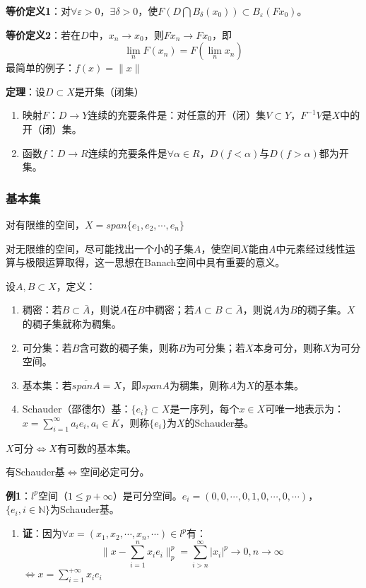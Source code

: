 \documentclass[12pt,a4paper]{article}
\begin{document}
\textbf{等价定义1}：对$\forall \varepsilon>0$，$\exists\delta>0$，使$F(D\bigcap B_{\delta}(x_0))\subset B_{\varepsilon}(Fx_0)$。

\textbf{等价定义2}：若在$D$中，$x_n\rightarrow x_0$，则$Fx_n\rightarrow Fx_0$，即
\begin{equation}
	\lim_nF(x_n)=F(\lim_nx_n)
\end{equation}
最简单的例子：$f(x)=\|x\|$

\textbf{定理}：设$D\subset X$是开集（闭集）
\begin{enumerate}
	\item 映射$F$：$D\rightarrow Y$连续的充要条件是：对任意的开（闭）集$V\subset Y$，$F^{-1}V$是$X$中的开（闭）集。
	\item 函数$f$：$D\rightarrow R$连续的充要条件是$\forall \alpha\in R$，$D(f<\alpha)$与$D(f>\alpha)$都为开集。
\end{enumerate}

\subsubsection{基本集}
对有限维的空间，$X=span\{e_1,e_2,\cdots,e_n\}$

对无限维的空间，尽可能找出一个小的子集$A$，使空间$X$能由$A$中元素经过线性运算与极限运算取得，这一思想在Banach空间中具有重要的意义。

设$A,B\subset X$，定义：
\begin{enumerate}
	\item 稠密：若$B\subset \bar{A}$，则说$A$在$B$中稠密；若$A\subset B\subset \bar{A}$，则说$A$为$B$的稠子集。$X$的稠子集就称为稠集。
	\item 可分集：若$B$含可数的稠子集，则称$B$为可分集；若$X$本身可分，则称$X$为可分空间。
	\item 基本集：若$\overline{spanA}=X$，即$spanA$为稠集，则称$A$为$X$的基本集。
	\item Schauder（邵德尔）基：$\{e_i\}\subset X$是一序列，每个$x\in X$可唯一地表示为：$x=\sum_{i=1}^{\infty}a_ie_i,a_i\in K$，则称$\{e_i\}$为$X$的Schauder基。
\end{enumerate}

$X$可分$\Leftrightarrow X$有可数的基本集。

有Schauder基$\Leftrightarrow$空间必定可分。

\textbf{例1}：$l^p$空间（$1\leqslant p +\infty$）是可分空间。$e_i=(0,0,\cdots,0,1,0,\cdots,0,\cdots)$，$\{e_i,i\in \mathbb{N}\}$为Schauder基。
\begin{enumerate}
	\item []
	\textbf{证}：因为$\forall x=(x_1,x_2,\cdots,x_n,\cdots)\in l^p$有：
\begin{equation}
	\|x-\sum_{i=1}^{n}x_ie_i\|_p^p=\sum_{i>n}^{\infty}|x_i|^p\rightarrow 0, n\rightarrow \infty
\end{equation}
$\Leftrightarrow x=\sum_{i=1}^{+\infty} x_ie_i$

\end{enumerate}
\end{document}
